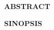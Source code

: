 \thispagestyle{front}

\begin{titlepage}
    \textbf{\large ABSTRACT} \par
    \detailabstractenglish
    \vfill

    \textbf{\large SINOPSIS} \par
    \detailabstractromanian
    \vfill
\end{titlepage}